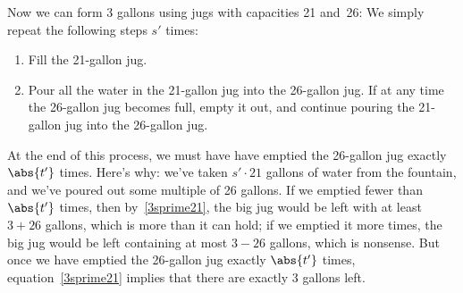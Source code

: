 Now we can form 3 gallons using jugs with capacities 21 and~26:  We
simply repeat the following steps $s'$ times:
\begin{enumerate}
\item Fill the 21-gallon jug.
\item Pour all the water in the 21-gallon jug into the 26-gallon jug.
If at any time the 26-gallon jug becomes full, empty it out, and
continue pouring the 21-gallon jug into the 26-gallon jug.
\end{enumerate}
At the end of this process, we must have have emptied the 26-gallon
jug exactly $\abs{t'}$ times.  Here's why: we've taken $s' \cdot 21$
gallons of water from the fountain, and we've poured out some multiple
of 26 gallons.  If we emptied fewer than $\abs{t'}$ times, then
by~\eqref{3sprime21}, the big jug would be left with at least $3+26$
gallons, which is more than it can hold; if we emptied it more times,
the big jug would be left containing at most $3-26$ gallons, which is
nonsense.  But once we have emptied the 26-gallon jug exactly
$\abs{t'}$ times, equation~\eqref{3sprime21} implies that there are
exactly 3 gallons left.

